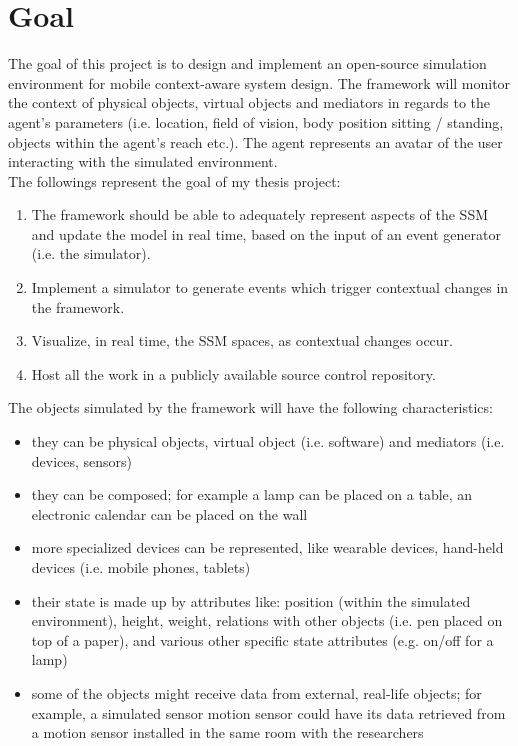 \section{Goal} %
\label{sec:goal}
The goal of this project is to design and implement an open-source simulation environment for mobile context-aware system design. The framework will monitor the context of physical objects, virtual objects and mediators \cite{pederson2011situative} in regards to the agent's parameters (i.e. location, field of vision, body position sitting / standing, objects within the agent's reach etc.). The agent represents an avatar of the user interacting with the simulated environment.\\

The followings represent the goal of my thesis project:
\begin{enumerate}
	\item The framework should be able to adequately represent aspects of the SSM and update the model in real time, based on the input of an event generator (i.e. the simulator).
	\item Implement a simulator to generate events which trigger contextual changes in the framework.
	\item Visualize, in real time, the SSM spaces, as contextual changes occur.
	\item Host all the work in a publicly available source control repository.
\end{enumerate}

The objects simulated by the framework will have the following characteristics:
\begin{itemize}
	\item they can be physical objects, virtual object (i.e. software) and mediators (i.e. devices, sensors)
	\item they can be composed; for example a lamp can be placed on a table, an electronic calendar can be placed on the wall
	\item more specialized devices can be represented, like wearable devices, hand-held devices (i.e. mobile phones, tablets)
	\item their state is made up by attributes like: position (within the simulated environment), height, weight, relations with other objects (i.e. pen placed on top of a paper), and various other specific state attributes (e.g. on/off for a lamp)
	\item some of the objects might receive data from external, real-life objects; for example, a simulated sensor motion sensor could have its data retrieved from a motion sensor installed in the same room with the researchers
\end{itemize}

